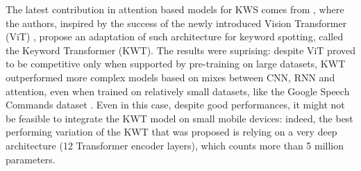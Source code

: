 The latest contribution in attention based models for KWS comes from \cite{kwtransformer2021berg}, where the authors, inspired by the success of the newly introduced Vision Transformer (ViT) \cite{vit2020Dosovitskiy}, propose an adaptation of such architecture for keyword spotting, called the Keyword Transformer (KWT). The results were suprising: despite ViT proved to be competitive only when supported by pre-training on large datasets, KWT outperformed more complex models based on mixes between CNN, RNN and attention, even when trained on relatively small datasets, like the Google Speech Commands dataset \cite{speechdataset2018warden}. Even in this case, despite good performances, it might not be feasible to integrate the KWT model on small mobile devices: indeed, the best performing variation of the KWT  that was proposed is relying on a very deep architecture (12 Transformer encoder layers), which counts more than 5 million parameters.
